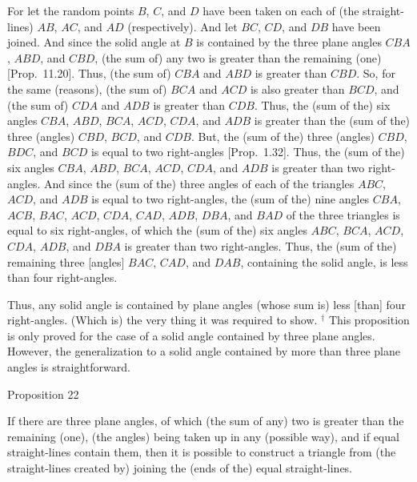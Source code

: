 For let the random points $B$, $C$, and $D$ have been taken on each of (the straight-lines)
 $AB$, $AC$, and $AD$ (respectively). And let $BC$, $CD$, and $DB$ have been joined.  And since the solid angle at $B$ is contained
by the three plane angles $CBA$, $ABD$, and $CBD$, (the sum of) any two
is greater than the remaining (one) [Prop.~11.20].
Thus, (the sum of) $CBA$ and $ABD$ is greater than $CBD$. So, for
the same (reasons), (the sum of) $BCA$ and $ACD$ is also greater than
$BCD$, and (the sum of) $CDA$ and $ADB$ is greater than $CDB$.
Thus, the (sum of the) six angles $CBA$, $ABD$, $BCA$, $ACD$, $CDA$,
and $ADB$ is greater than the (sum of the) three (angles) $CBD$, $BCD$,
and $CDB$. But, the (sum of the) three (angles) $CBD$, $BDC$, and
$BCD$ is equal to two right-angles [Prop.~1.32].
Thus, the (sum of the) six angles $CBA$, $ABD$, $BCA$, $ACD$, $CDA$,
and $ADB$ is greater than two right-angles.
And since the (sum of the) three angles of each of the triangles
$ABC$, $ACD$, and $ADB$ is equal to two right-angles, the (sum of the)
nine angles $CBA$, $ACB$, $BAC$, $ACD$, $CDA$, $CAD$, $ADB$,
$DBA$, and $BAD$ of the three triangles is equal to six right-angles,
of which the (sum of the) six angles $ABC$, $BCA$, $ACD$, $CDA$,
$ADB$, and $DBA$ is greater than two right-angles. Thus, the (sum of the)
remaining three [angles] $BAC$, $CAD$, and $DAB$, containing the
solid angle, is less than four right-angles.

Thus, any solid angle is contained by plane angles (whose sum is) less [than]
four  right-angles. (Which is) the very thing it was required to show.
{\footnotesize\noindent$^\dag$ This proposition is only proved for the case of a solid angle contained by three plane angles. However, the generalization to
a solid angle contained by more than three plane angles is straightforward.}


\begin{center}
{\large Proposition 22}
\end{center}

If there are three plane angles, of which (the sum of any)
two is greater than the remaining (one), (the angles) being taken up in
any (possible way), and if equal straight-lines contain them, then it is
possible to construct a triangle from (the straight-lines created by) joining the
(ends of the) equal straight-lines.

\epsfysize=0.9in
\centerline{}

